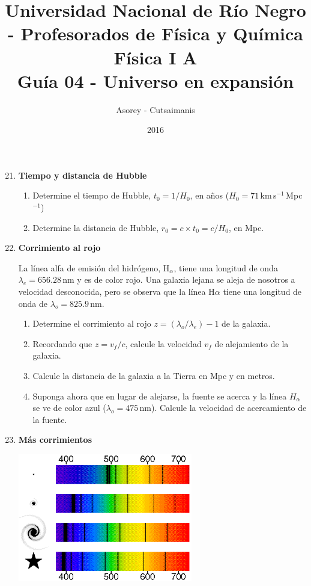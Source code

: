 \documentclass[a4paper,12pt]{article}
\begin{document}
\title{
{\normalsize{Universidad Nacional de Río Negro - Profesorados de Física y
Química}}\\ Física I A \\ Guía 04 - Universo en expansión}
\author{Asorey - Cutsaimanis}
\date{2016}
\maketitle

\begin{enumerate}
\setcounter{enumi}{20}      %

\item {\bf{Tiempo y distancia de Hubble}}

\begin{enumerate}
\item Determine el tiempo de Hubble, $t_0 = 1 / H_0$, en años
($H_0=71$\,km\,s$^{-1}$\,Mpc$^{-1}$)
\item Determine la distancia de Hubble, $r_0 = c\times t_0 = c / H_0$, en Mpc.
\end{enumerate}

\item {\bf{Corrimiento al rojo}}

La línea alfa de emisión del hidrógeno, H$_\alpha$, tiene una longitud de onda
$\lambda_e = 656.28$\,nm y es de color rojo. Una galaxia lejana se aleja de
nosotros a velocidad desconocida, pero se observa que la línea H$\alpha$ tiene
una longitud de onda de $\lambda_o=825.9$\,nm.
\begin{enumerate}
\item Determine el corrimiento al rojo $z=\left ( \lambda_o/\lambda_e \right )
- 1$ de la galaxia.
\item Recordando que $z=v_f/c$, calcule la velocidad $v_f$ de alejamiento de la
galaxia.
\item Calcule la distancia de la galaxia a la Tierra en Mpc y en metros.
\item Suponga ahora que en lugar de alejarse, la fuente se acerca y la línea
$H_\alpha$ se ve de color azul ($\lambda_o=475$\,nm). Calcule la velocidad de
acercamiento de la fuente.
\end{enumerate}

\item {\bf{Más corrimientos}}

\begin{center}\includegraphics[width=0.6\textwidth]{redshift.png}\end{center}


\end{enumerate}
\end{document}
